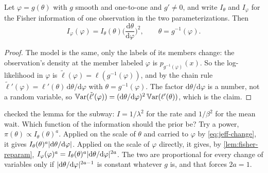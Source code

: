 
\begin{lemma}
\label{lem:fisher-reparam}
Let $\varphi = g(\theta)$ with $g$ smooth and one-to-one and $g' \neq 0$, and write $I_\theta$ and $I_\varphi$ for the Fisher information of one observation in the two parameterizations. Then
\[
I_\varphi(\varphi) = I_\theta(\theta)\Big(\frac{\mathrm{d}\theta}{\mathrm{d}\varphi}\Big)^2, \qquad \theta = g^{-1}(\varphi).
\]
\end{lemma}

\begin{proof}
The model is the same, only the labels of its members change: the observation's density at the member labeled $\varphi$ is $p_{g^{-1}(\varphi)}(x)$. So the log-likelihood in $\varphi$ is $\tilde{\ell}(\varphi) = \ell(g^{-1}(\varphi))$, and by the chain rule $\tilde{\ell}'(\varphi) = \ell'(\theta)\,\mathrm{d}\theta/\mathrm{d}\varphi$ with $\theta = g^{-1}(\varphi)$. The factor $\mathrm{d}\theta/\mathrm{d}\varphi$ is a number, not a random variable, so $\operatorname*{\mathbb{V}\text{ar}}(\tilde{\ell}'(\varphi)) = (\mathrm{d}\theta/\mathrm{d}\varphi)^2\operatorname*{\mathbb{V}\text{ar}}(\ell'(\theta))$, which is the claim.
\end{proof}

 checked the lemma for the subway: $I = 1/\lambda^2$ for the rate and $1/\beta^2$ for the mean wait.
Which function of the information should the prior be?
Try a power, $\pi(\theta) \propto I_\theta(\theta)^a$.
Applied on the scale of $\theta$ and carried to $\varphi$ by \cref{eq:jeff-change}, it gives $I_\theta(\theta)^a\lvert\mathrm{d}\theta/\mathrm{d}\varphi\rvert$.
Applied on the scale of $\varphi$ directly, it gives, by \cref{lem:fisher-reparam}, $I_\varphi(\varphi)^a = I_\theta(\theta)^a\lvert\mathrm{d}\theta/\mathrm{d}\varphi\rvert^{2a}$.
The two are proportional for every change of variables only if $\lvert\mathrm{d}\theta/\mathrm{d}\varphi\rvert^{2a - 1}$ is constant whatever $g$ is, and that forces $2a = 1$.

